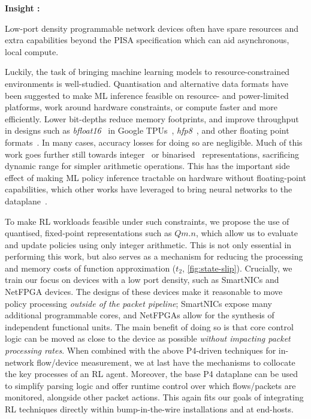 \documentclass[sigconf,natbib=false]{acmart}
\newcounter{insightc}
\newenvironment{insight}
	{
		\begin{tipblock}\refstepcounter{insightc}\textbf{Insight \theinsightc:}\em
	}
	{
		\end{tipblock}
	}
\begin{document}
\begin{insight}
	Low-port density programmable network devices often have spare resources and extra capabilities beyond the PISA specification which can aid asynchronous, local compute.
\end{insight}

Luckily, the task of bringing machine learning models to resource-constrained environments is well-studied.
Quantisation and alternative data formats have been suggested to make ML inference feasible on resource- and power-limited platforms, work around hardware constraints, or compute faster and more efficiently.
Lower bit-depths reduce memory footprints, and improve throughput in designs such as \emph{bfloat16}~\parencite{bfloat16-blog} in Google TPUs~\parencite{DBLP:journals/sigops/XieDMKVZT18}, \emph{hfp8}~\parencite{DBLP:conf/nips/SunCCWVSCZG19}, and other floating point formats~\parencite{DBLP:journals/corr/abs-2007-01530}.
In many cases, accuracy losses for doing so are negligible.
Much of this work goes further still towards integer~\parencite{tensorrt-8bit} or binarised~\parencite{DBLP:journals/corr/MiyashitaLM16,DBLP:conf/eccv/RastegariORF16,DBLP:journals/corr/KimS16,DBLP:conf/nips/HubaraCSEB16} representations, sacrificing dynamic range for simpler arithmetic operations.
This has the important side effect of making ML policy inference tractable on hardware without floating-point capabilities, which other works have leveraged to bring neural networks to the dataplane~\parencite{DBLP:journals/corr/abs-2009-02353,DBLP:conf/sigcomm/SanvitoSB18,DBLP:journals/corr/abs-1801-05731}.

To make RL workloads feasible under such constraints, we propose the use of quantised, fixed-point representations such as $Qm.n$, which allow us to evaluate and update policies using only integer arithmetic.
This is not only essential in performing this work, but also serves as a mechanism for reducing the processing and memory costs of function approximation ($t_2$, \cref{fig:state-slip}).
Crucially, we train our focus on devices with a low port density, such as SmartNICs and NetFPGA devices.
The designs of these devices make it reasonable to move policy processing \emph{outside of the packet pipeline}; SmartNICs expose many additional programmable cores, and NetFPGAs allow for the synthesis of independent functional units.
The main benefit of doing so is that core control logic can be moved as close to the device as possible \emph{without impacting packet processing rates}.
When combined with the above P4-driven techniques for in-network flow/device measurement, we at last have the mechanisms to collocate the key processes of an RL agent.
Moreover, the base P4 dataplane can be used to simplify parsing logic and offer runtime control over which flows/packets are monitored, alongside other packet actions.
This again fits our goals of integrating RL techniques directly within bump-in-the-wire installations and at end-hosts.
\end{document}

